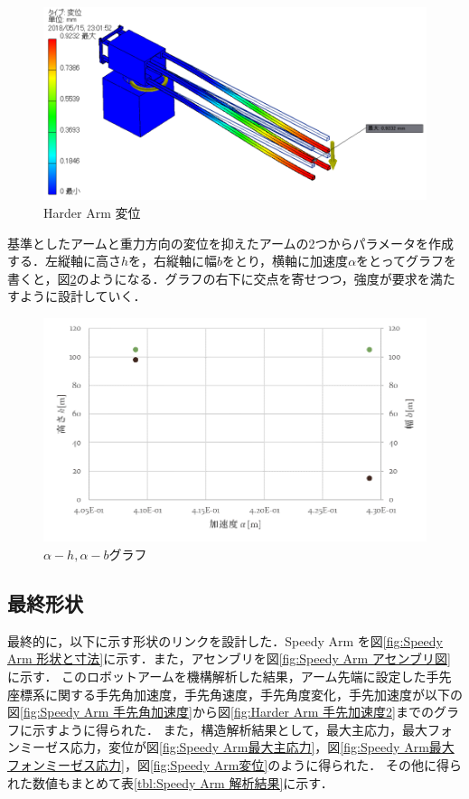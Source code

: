 \documentclass[10pt,b5paper,papersize,dvipdfmx]{jsbook}
\begin{document}
\begin{figure}[htbp]
  \centering
  \includegraphics[width=13cm]{img/robot20.png}
  \caption{Harder Arm 変位}
  \label{fig:Harder Arm 変位}
\end{figure}
基準としたアームと重力方向の変位を抑えたアームの2つからパラメータを作成する．左縦軸に高さ$h$を，右縦軸に幅$b$をとり，横軸に加速度$\alpha$をとってグラフを書くと，図\ref{fig:alpha-h, alpha-b グラフ}のようになる．グラフの右下に交点を寄せつつ，強度が要求を満たすように設計していく．
\begin{figure}[htbp]
  \centering
  \includegraphics[width=13cm]{img/robot21.png}
  \caption{$\alpha-h, \alpha-b$グラフ}
  \label{fig:alpha-h, alpha-b グラフ}
\end{figure}

\clearpage
\subsection{最終形状}
最終的に，以下に示す形状のリンクを設計した．Speedy Arm を図\ref{fig:Speedy Arm 形状と寸法}に示す．また，アセンブリを図\ref{fig:Speedy Arm アセンブリ図}に示す．
このロボットアームを機構解析した結果，アーム先端に設定した手先座標系に関する手先角加速度，手先角速度，手先角度変化，手先加速度が以下の図\ref{fig:Speedy Arm 手先角加速度}から図\ref{fig:Harder Arm 手先加速度2}までのグラフに示すように得られた．
また，構造解析結果として，最大主応力，最大フォンミーゼス応力，変位が図\ref{fig:Speedy Arm最大主応力}，図\ref{fig:Speedy Arm最大フォンミーゼス応力}，図\ref{fig:Speedy Arm変位}のように得られた．
その他に得られた数値もまとめて表\ref{tbl:Speedy Arm 解析結果}に示す．
\end{document}
